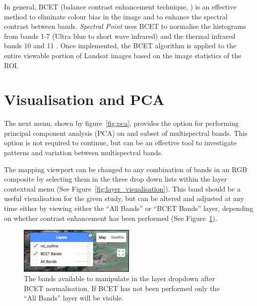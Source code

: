 \documentclass[12pt]{article}
\begin{document}
In general, BCET (balance contrast enhancement technique, \citet{guo1991,LiuMason2009}) is an effective method to eliminate colour bias in the image and to enhance the spectral contrast between bands. \textit{Spectral Point} uses BCET to normalise the histograms from bands 1-7 (Ultra blue to short wave infrared) and the thermal infrared bands 10 and 11 \citep{barsi2014}. Once implemented, the BCET algorithm is applied to the entire viewable portion of Landsat images based on the image statistics of the ROI.

\section{Visualisation and PCA}
\label{sec:vis_and_pca}

The next menu, shown by figure~\ref{fig:pca}, provides the option for performing principal component analysis (PCA) on and subset of multispectral bands. This option is not required to continue, but can be an effective tool to investigate patterns and variation between multispectral bands.

The mapping viewport can be changed to any combination of bands in an RGB composite by selecting them in the three drop down lists within the layer contextual menu (See Figure~\ref{fig:layer_visualisation}). This band should be a useful visualisation for the given study, but can be altered and adjusted at any time either by viewing either the ``All Bands'' or ``BCET Bands'' layer, depending on whether contrast enhancement has been performed (See Figure~\ref{fig:available_bands}).

\vspace{2em}
\begin{figure}[htbp]
\centering
\includegraphics[width=0.5\textwidth]{images/available_layers_reduced.jpg}
\caption{The bands available to manipulate in the layer dropdown after BCET normalisation. If BCET has not been performed only the ``All Bands'' layer will be visible.}
\label{fig:available_bands}
\end{figure}
\end{document}

